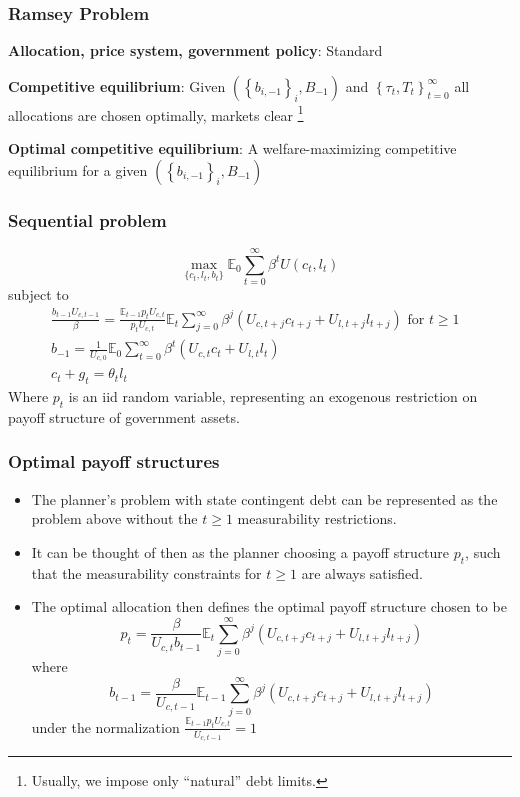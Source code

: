 \documentclass{beamer}
\newcommand{\EE}{\mathbb E}
\begin{document}
\begin{frame}
 \frametitle{Ramsey Problem}

\begin{definition}
\textbf{Allocation, price system, government policy}: Standard

\end{definition}

\begin{definition}
\textbf{Competitive equilibrium}: Given $\left( \left\{ b_{i,-1}\right\}
_{i},B_{-1}\right) $ and $\left\{ \tau _{t},T_{t}\right\} _{t=0}^{\infty }$
all allocations are chosen optimally, markets clear \footnote{Usually, we impose only  ``natural'' debt limits. }
\end{definition}

\begin{definition}
\textbf{Optimal competitive equilibrium}: A welfare-maximizing competitive
equilibrium for a given $\left( \left\{ b_{i,-1}\right\} _{i},B_{-1}\right) $
\end{definition}

 \end{frame}
 
 
 \begin{frame}
 \frametitle{Sequential problem}  
\[
	\max_{\{c_t,l_t,b_t\}} \EE_0\sum_{t=0}^\infty \beta^t U(c_t,l_t)
\]subject to
\begin{align*}
	\frac{b_{t-1}U_{c,t-1}}{\beta} = \frac{\EE_{t-1} p_t U_{c,t}}{p_t U_{c,t}}\EE_t\sum_{j=0}^\infty\beta^j\left( U_{c,t+j}c_{t+j}+U_{l,t+j}l_{t+j}\right)\text{  for $t\geq 1$ }\\
	b_{-1} = \frac1{U_{c,0}}\EE_0\sum_{t=0}^\infty \beta^t\left(U_{c,t}c_t+U_{l,t}l_t\right)\\
	c_t + g_t = \theta_t l_t
\end{align*}
Where $p_t$ is an iid random variable, representing an exogenous restriction on payoff structure of government assets.
  \end{frame}
  
 \begin{frame}
\frametitle{Optimal payoff structures}
\begin{itemize}
\item The planner's problem with state contingent debt can be represented as the problem above without the $t\geq1$ measurability restrictions.
\item  It can be thought of then as the planner choosing a payoff structure $p_t$, such that the measurability constraints for $t\geq 1$ are always satisfied.
\item  The optimal allocation then defines the optimal payoff structure chosen to be
\[
	p_t = \frac{\beta}{U_{c,t}b_{t-1}}\EE_t\sum_{j=0}^\infty\beta^j\left(U_{c,t+j}c_{t+j}+U_{l,t+j}l_{t+j}\right)
\]where
\[
	b_{t-1} = \frac{\beta}{U_{c,t-1}}\EE_{t-1}\sum_{j=0}^\infty\beta^j\left(U_{c,t+j}c_{t+j}+U_{l,t+j}l_{t+j}\right)
\]under the normalization $\frac{\EE_{t-1} p_t U_{c,t}}{U_{c,t-1}} = 1$
\end{itemize}
\end{frame} 
\end{document}
